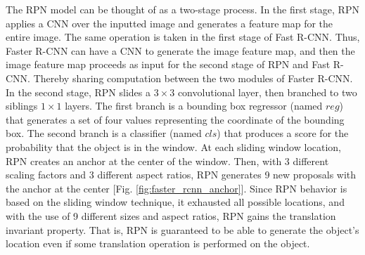 The RPN model can be thought of as a two-stage process. In the first stage, RPN applies a CNN over the inputted image and generates a feature map for the entire image. The same operation is taken in the first stage of Fast R-CNN. Thus, Faster R-CNN can have a CNN to generate the image feature map, and then the image feature map proceeds as input for the second stage of RPN and Fast R-CNN. Thereby sharing computation between the two modules of Faster R-CNN. In the second stage, RPN slides a $3 \times 3$ convolutional layer, then branched to two siblings $1 \times 1$ layers. The first branch is a bounding box regressor (named $reg$) that generates a set of four values representing the coordinate of the bounding box. The second branch is a classifier (named $cls$) that produces a score for the probability that the object is in the window. At each sliding window location, RPN creates an anchor at the center of the window. Then, with 3 different scaling factors and 3 different aspect ratios, RPN generates 9 new proposals with the anchor at the center [Fig. \ref{fig:faster_rcnn_anchor}]. Since RPN behavior is based on the sliding window technique, it exhausted all possible locations, and with the use of 9 different sizes and aspect ratios, RPN gains the translation invariant property. That is, RPN is guaranteed to be able to generate the object's location even if some translation operation is performed on the object.

